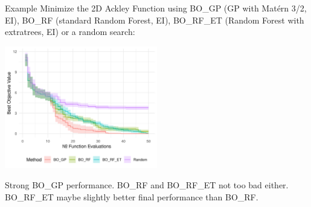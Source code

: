 \documentclass[11pt,compress,t,notes=noshow, xcolor=table]{beamer}
\begin{document}
\begin{frame}{Example}
Minimize the 2D Ackley Function using BO\_GP (GP with Matérn 3/2, EI), BO\_RF (standard Random Forest, EI), BO\_RF\_ET (Random Forest with extratrees, EI) or a random search:
\begin{center}
  \includegraphics[width = 0.5\textwidth]{figure_man/surrogate_2.png}
\end{center}
Strong BO\_GP performance. BO\_RF and BO\_RF\_ET not too bad either. BO\_RF\_ET maybe slightly better final performance than BO\_RF.
\end{frame}

\endlecture
\end{document}
